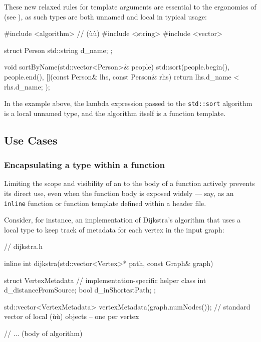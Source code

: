 These new relaxed rules for template arguments are essential to the
ergonomics of  (see ), as such types are both
unnamed and local in typical usage:

\begin{emcppslisting}[language=C++]
#include <algorithm> // (ù{}ù)
#include <string>
#include <vector>

struct Person { std::string d_name; };

void sortByName(std::vector<Person>& people)
{
    std::sort(people.begin(), people.end(),
              [](const Person& lhs, const Person& rhs)
              {
                  return lhs.d_name < rhs.d_name;
              });
}
\end{emcppslisting}

\noindent In the example above, the lambda expression passed to the
\lstinline!std::sort! algorithm is a local unnamed type, and the algorithm
itself is a function template.

\subsection[Use Cases]{Use Cases}\label{use-cases}

\subsubsection[Encapsulating a type within a function]{Encapsulating a type within a function}\label{encapsulating-a-type-within-a-function}

Limiting the scope and visibility of an  to the body of a
function actively prevents its direct use, even when the function body
is exposed widely --- say, as an \lstinline!inline! function or function
template defined within a header file.

Consider, for instance, an implementation of Dijkstra's algorithm that
uses a local type to keep track of metadata for each vertex in the input
graph:

\begin{emcppslisting}[language=C++]
// dijkstra.h

inline int dijkstra(std::vector<Vertex>* path, const Graph& graph)
{
    struct VertexMetadata         // implementation-specific helper class
    {
        int  d_distanceFromSource;
        bool d_inShortestPath;
    };

    std::vector<VertexMetadata> vertexMetadata(graph.numNodes());
        // standard vector of local (ù{}ù) objects -- one per vertex

    // ... (body of algorithm)
}
\end{emcppslisting}

